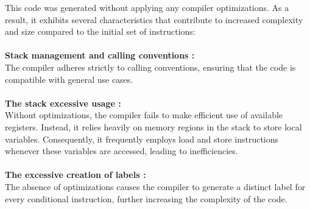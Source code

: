 \documentclass[a4paper,12pt]{article}
\begin{document}
%
This code was generated without applying any compiler optimizations. As a result, it exhibits several characteristics that contribute to increased complexity and size compared to the initial set of instructions:\\
\\
%
\textbf{Stack management and calling conventions :}\\
The compiler adheres strictly to calling conventions, ensuring that the code is compatible with general use cases.\\
\\
%
\textbf{The stack excessive usage :}\\
Without optimizations, the compiler fails to make efficient use of available registers. Instead, it relies heavily on memory regions in the stack to store local variables. Consequently, it frequently employs load and store instructions whenever these variables are accessed, leading to inefficiencies.\\
\\
%
\textbf{The excessive creation of labels :}\\
The absence of optimizations causes the compiler to generate a distinct label for every conditional instruction, further increasing the complexity of the code.
\end{document}
